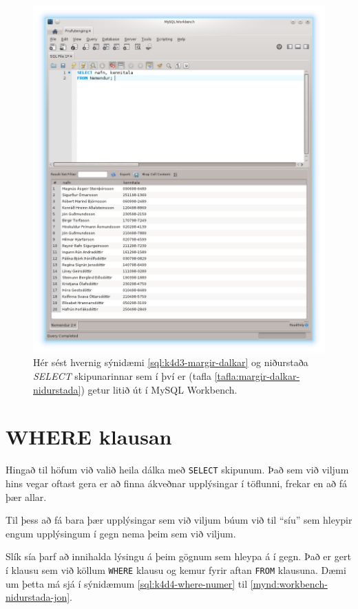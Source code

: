 \begin{figure}
\caption[Niðurstöður margra dálka SELECT í Workbench]{Hér sést hvernig sýnidæmi \ref{sql:k4d3-margir-dalkar} og niðurstaða \emph{SELECT} skipunarinnar sem í því er (tafla \ref{tafla:margir-dalkar-nidurstada}) getur litið út í MySQL Workbench.}
\label{mynd:workbench-nidurstada-margir-dalkar}
\centering
\includegraphics[width=\linewidth]{myndir/workbench-nidurstada-margir-dalkar}
\end{figure}
\section{WHERE klausan}
Hingað til höfum við valið heila dálka með \verb|SELECT| skipunum. Það sem við viljum hins vegar oftast gera er að finna ákveðnar upplýsingar í töflunni, frekar en að fá þær allar.

Til þess að fá bara þær upplýsingar sem við viljum búum við til ``síu'' sem hleypir engum upplýsingum í gegn nema þeim sem við viljum.

Slík sía þarf að innihalda lýsingu á þeim gögnum sem hleypa á í gegn. Það er gert í klausu sem við köllum \verb|WHERE| klausu og kemur fyrir aftan \verb|FROM| klausuna. Dæmi um þetta má sjá í sýnidæmum \ref{sql:k4d4-where-numer} til \ref{mynd:workbench-nidurstada-jon}.

